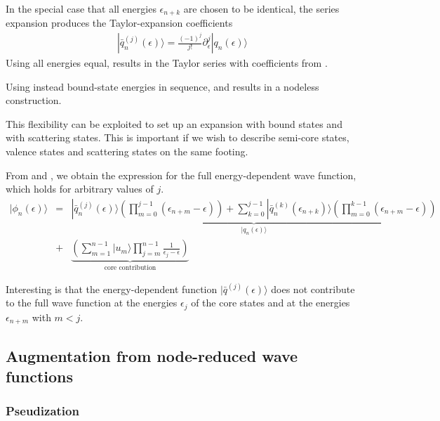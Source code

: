 \documentclass[11pt,a4paper]{report}
\begin{document}
In the special case that all energies $\epsilon_{n+k}$ are chosen to
be identical, the series expansion  produces the
Taylor-expansion coefficients
\begin{eqnarray}
|\bar{q}_n^{(j)}(\epsilon)\rangle=
\frac{(-1)^j}{j!}\partial_\epsilon^j|q_n(\epsilon)\rangle
\label{eq:taylorexpansioncoefficientsqn}
\end{eqnarray}
Using all energies equal,  results in the Taylor
series with coefficients from .

Using instead bound-state energies in sequence,  and
 results in a nodeless construction.

This flexibility can be exploited to set up an expansion with bound
states and with scattering states. This is important if we wish to
describe semi-core states, valence states and scattering states on the
same footing.

From  and , we obtain the
expression for the full energy-dependent wave function, which holds
for arbitrary values of $j$.
\begin{eqnarray}
|\phi_n(\epsilon)\rangle
&=&
\underbrace{
|\bar{q}_n^{(j)}(\epsilon)\rangle
\left(\prod_{m=0}^{j-1}(\epsilon_{n+m}-\epsilon)\right)
+
\sum_{k=0}^{j-1}
|\bar{q}_{n}^{(k)}(\epsilon_{n+k})\rangle
\left(\prod_{m=0}^{k-1}(\epsilon_{n+m}-\epsilon)\right)
}_{|q_n(\epsilon)\rangle}
\nonumber\\
&+&
\underbrace{
\left(\sum_{m=1}^{n-1}|u_m\rangle\prod_{j=m}^{n-1}\frac{1}{\epsilon_j-\epsilon}\right)
}_{\text{core contribution}}
\label{eq:phincompletediscreteandcont}
\end{eqnarray}

Interesting is that the energy-dependent function
$|\bar{q}^{(j)}(\epsilon)\rangle$ does not contribute to the full wave
function at the energies $\epsilon_{j}$ of the core states and at the
energies $\epsilon_{n+m}$ with $m<j$.



\subsection{Augmentation from node-reduced wave functions}
\subsubsection{Pseudization}
\end{document}
